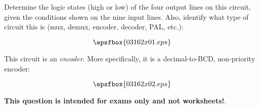 

Determine the logic states (high or low) of the four output lines on this circuit, given the conditions shown on the nine input lines.  Also, identify what type of circuit this is (mux, demux, encoder, decoder, PAL, etc.):

$$\epsfbox{03162x01.eps}$$







This circuit is an {\it encoder}.  More specifically, it is a decimal-to-BCD, non-priority encoder:

$$\epsfbox{03162x02.eps}$$







{\bf This question is intended for exams only and not worksheets!}.




